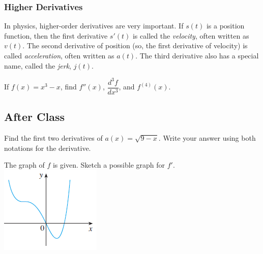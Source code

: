\documentclass[notes]{subfiles}
\begin{document}
	\subsubsection*{Higher Derivatives}
		In physics, higher-order derivatives are very important.  If $s(t)$ is a position function, then the first derivative $s'(t)$ is called the \emph{velocity}, often written as $v(t)$.  The second derivative of position (so, the first derivative of velocity) is called \emph{acceleration}, often written as $a(t)$.  The third derivative also has a special name, called the \emph{jerk}, $j(t)$.
		\begin{rmk}
		\end{rmk}
	
		\begin{ex}
			If $f(x) = x^3-x$, find $f''(x)$, $\dfrac{d^3f}{dx^3}$, and $f^{(4)}(x)$.
		\end{ex}		
			\newpage
	
	\subsection*{After Class}	
		\begin{ex}
			Find the first two derivatives of $a(x) = \sqrt{9-x}$.  Write your answer using both notations for the derivative.
		\end{ex}	
			
		\begin{ex}
			The graph of $f$ is given.  Sketch a possible graph for $f'$.  \\
			\includegraphics[scale = 1.2]{2.2fig4}
		\end{ex}
	\clearpage
\end{document}
